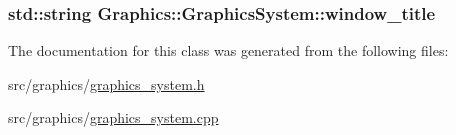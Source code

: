 \subsubsection[{window\+\_\+title}]{\setlength{\rightskip}{0pt plus 5cm}std\+::string Graphics\+::\+Graphics\+System\+::window\+\_\+title\hspace{0.3cm}{\ttfamily [private]}}\label{class_graphics_1_1_graphics_system_a7b543ac0f4323ec286519a3dfef0df1c}


The documentation for this class was generated from the following files\+:\begin{DoxyCompactItemize}
\item 
src/graphics/\hyperlink{graphics__system_8h}{graphics\+\_\+system.\+h}\item 
src/graphics/\hyperlink{graphics__system_8cpp}{graphics\+\_\+system.\+cpp}\end{DoxyCompactItemize}
